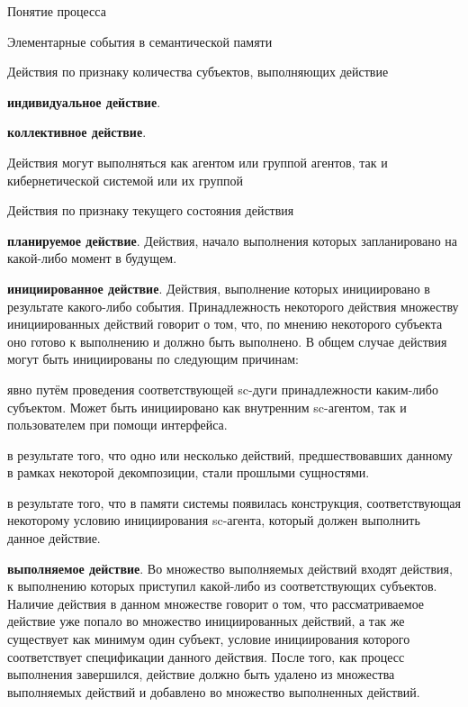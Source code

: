 \begin{frame}{\large Понятие процесса}
\begin{frame}{\large Элементарные события в семантической памяти}
\begin{frame}{Действия по признаку количества субъектов, выполняющих действие}
    \begin{textitemize}
        \item \textbf{индивидуальное действие}.
        \item \textbf{коллективное действие}.
    \end{textitemize}
    Действия могут выполняться как агентом или группой агентов, так и кибернетической системой или их группой
\end{frame}

\begin{frame}{\large Действия по признаку текущего состояния действия}
\vspace{20}
    \begin{textitemize}
        \item \textbf{планируемое действие}. Действия, начало выполнения которых запланировано на какой-либо момент в будущем. 
        \item \textbf{инициированное действие}. Действия, выполнение которых инициировано в результате какого-либо события. Принадлежность некоторого действия множеству инициированных действий говорит о том, что, по мнению некоторого субъекта оно готово к выполнению и должно быть выполнено.  В общем случае действия могут быть инициированы по следующим причинам:
        \begin{textitemize}
            \item явно путём проведения соответствующей sc-дуги принадлежности каким-либо субъектом. Может быть инициировано как внутренним sc-агентом, так и пользователем при помощи интерфейса.
            \item в результате того, что одно или несколько действий, предшествовавших данному в рамках некоторой декомпозиции, стали прошлыми сущностями.
            \item в результате того, что в памяти системы появилась конструкция, соответствующая некоторому условию инициирования sc-агента, который должен выполнить данное действие.
        \end{textitemize}
    \end{textitemize}
\end{frame}
\begin{frame}{}
    \begin{textitemize}
        \item \textbf{выполняемое действие}. Во множество выполняемых действий входят действия, к выполнению которых приступил какой-либо из соответствующих субъектов. Наличие действия в данном множестве говорит о том, что рассматриваемое действие уже попало во множество инициированных действий, а так же существует как минимум один субъект, условие инициирования которого соответствует спецификации данного действия. После того, как процесс выполнения завершился, действие должно быть удалено из множества выполняемых действий и добавлено во множество выполненных действий. 

\end{textitemize}
\end{frame}
\end{frame}
\end{frame}
